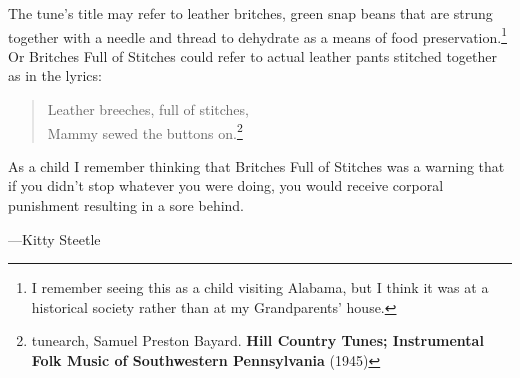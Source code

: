 \documentclass[10pt]{article}
\begin{document}
{\begin{minipage}{7.0in}
The tune's title may refer to leather britches, green snap beans that
are strung together with a needle and thread to dehydrate as a means
of food preservation.\footnote{I remember seeing this as a child
  visiting Alabama, but I think it was at a historical society rather
  than at my Grandparents' house.} Or Britches Full of Stitches could
refer to actual leather pants stitched together as in the lyrics:

\begin{quote}
  Leather breeches, full of stitches, \\
  Mammy sewed the buttons on.\footnote{tunearch, Samuel Preston Bayard. \textbf{Hill Country
    Tunes; Instrumental Folk Music of Southwestern Pennsylvania} (1945)}
\end{quote}

As a child I remember thinking that Britches Full of Stitches was a
warning that if you didn't stop whatever you were doing, you would
receive corporal punishment resulting in a sore behind.

---Kitty Steetle    
    
    
  \end{minipage}
}
\end{document}
